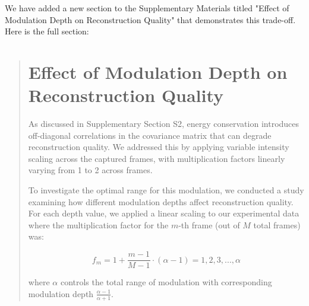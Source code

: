 \documentclass[12pt]{article}
\newenvironment{ourresponse}
    {\begin{tcolorbox}[width=\linewidth,breakable,enhanced,colback=gray!5,colframe=responsecolor!50,title=Response,left=5pt,right=5pt]}
    {\end{tcolorbox}}
\begin{document}
\begin{enumerate}[label=\arabic*.]
\begin{ourresponse}
We have added a new section to the Supplementary Materials titled "Effect of Modulation Depth on Reconstruction Quality" that demonstrates this trade-off. Here is the full section:

\begin{quote}
\section{Effect of Modulation Depth on Reconstruction Quality}

As discussed in Supplementary Section S2, energy conservation introduces off-diagonal correlations in the covariance matrix that can degrade reconstruction quality. We addressed this by applying variable intensity scaling across the captured frames, with multiplication factors linearly varying from 1 to 2 across frames.

To investigate the optimal range for this modulation, we conducted a study examining how different modulation depths affect reconstruction quality. For each depth value, we applied a linear scaling to our experimental data where the multiplication factor for the $m$-th frame (out of $M$ total frames) was:

\begin{equation}
    f_m = 1 + \frac{m-1}{M-1} \cdot (\alpha -1) = 1, 2, 3, ..., \alpha
\end{equation}

where $\alpha$ controls the total range of modulation with corresponding modulation depth $\frac{\alpha-1}{\alpha+1}$.

\end{quote}
\end{ourresponse}
\end{enumerate}
\end{document}
